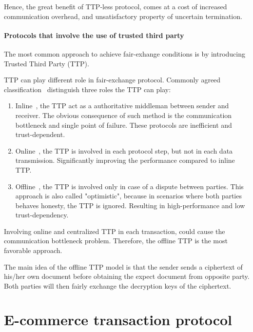 \documentclass{article}
\begin{document}
Hence, the great benefit of TTP-less protocol, comes at a cost of increased communication overhead, and unsatisfactory property of uncertain termination.


\paragraph{Protocols that involve the use of trusted third party}
The most common approach to achieve fair-exhange conditions is by introducing Trusted Third Party (TTP).  

TTP can play different role in fair-exchange protocol. Commonly agreed classification~\cite{kremer2002intensive,duangphasuk2020fair} distinguish three roles the TTP can play:

\begin{enumerate}
    \item Inline~\cite{coffey1996non}, the TTP act as a authoritative middleman between sender and receiver. The obvious consequence of such method is the communication bottleneck and single point of failure. These protocols are inefficient and trust-dependent.
    
    \item Online~\cite{djuric2015feips}, the TTP is involved in each protocol step, but not in each data transmission. Significantly improving the performance compared to inline TTP.
    
    \item Offline~\cite{hwang2015provable}, the TTP is involved only in case of a dispute between parties. This approach is also called "optimistic", because in scenarios where both parties behaves honesty, the TTP is ignored. Resulting in high-performance and low trust-dependency. 
\end{enumerate}

Involving online and centralized TTP in each transaction, could cause the communication bottleneck problem. Therefore, the offline TTP is the most favorable approach.

The main idea of the offline TTP model is that the sender sends a ciphertext of his/her own document before obtaining the expect document from opposite party. Both parties will then fairly exchange the decryption keys of the ciphertext. 

\section{E-commerce transaction protocol}
\end{document}
